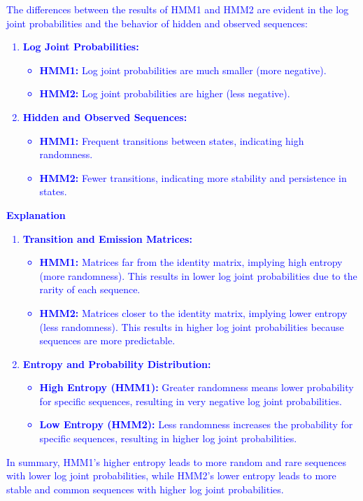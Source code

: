 \documentclass[a4 paper]{article}
\begin{document}
\begin{enumerate}
    \textcolor{blue}{
        The differences between the results of HMM1 and HMM2 are evident in the log joint probabilities and the behavior of hidden and observed sequences: \\
        \begin{enumerate}
            \item \textbf{Log Joint Probabilities:}
            \begin{itemize}
                \item \textbf{HMM1:} Log joint probabilities are much smaller (more negative).
                \item \textbf{HMM2:} Log joint probabilities are higher (less negative).
            \end{itemize}
            \item \textbf{Hidden and Observed Sequences:}
            \begin{itemize}
                \item \textbf{HMM1:} Frequent transitions between states, indicating high randomness.
                \item \textbf{HMM2:} Fewer transitions, indicating more stability and persistence in states.
            \end{itemize}
        \end{enumerate}
        \textbf{Explanation}
        \begin{enumerate}
            \item \textbf{Transition and Emission Matrices:}
            \begin{itemize}
                \item \textbf{HMM1:} Matrices far from the identity matrix, implying high entropy (more randomness). This results in lower log joint probabilities due to the rarity of each sequence.
                \item \textbf{HMM2:} Matrices closer to the identity matrix, implying lower entropy (less randomness). This results in higher log joint probabilities because sequences are more predictable.
            \end{itemize}
            \item \textbf{Entropy and Probability Distribution:}
            \begin{itemize}
                \item \textbf{High Entropy (HMM1):} Greater randomness means lower probability for specific sequences, resulting in very negative log joint probabilities.
                \item \textbf{Low Entropy (HMM2):} Less randomness increases the probability for specific sequences, resulting in higher log joint probabilities.
            \end{itemize}
        \end{enumerate}
        In summary, HMM1’s higher entropy leads to more random and rare sequences with lower log joint probabilities, while HMM2’s lower entropy leads to 
        more stable and common sequences with higher log joint probabilities.
    }
    

\end{enumerate}
\end{document}

